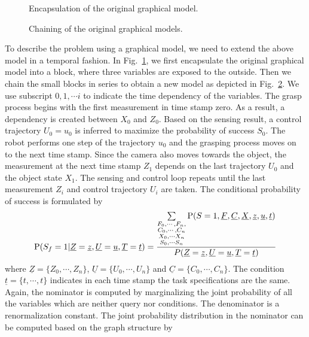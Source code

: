 \begin{figure}[!htbp]
\centering
%
\resizebox{0.5\textwidth}{!}{}
\captionsetup{justification=raggedright}
\caption{Encapsulation of the original graphical model.}
\label{fig:boxmodel}
\end{figure}	
\begin{figure}[!htbp]
\centering
%
\resizebox{1\textwidth}{!}{}
\captionsetup{justification=raggedright}
\caption{Chaining of the original graphical models.}
\label{fig:dbnet}
\end{figure}	
To describe the problem using a graphical model, we need to extend the above model in a temporal fashion. In Fig.~\ref{fig:boxmodel}, we first encapsulate the original graphical model into a block, where three variables are exposed to the outside. Then we chain the small blocks in series to obtain a new model as depicted in Fig.~\ref{fig:dbnet}. We use subscript $0,1,\cdots i$ to indicate the time dependency of the variables. The grasp process begins with the first measurement in time stamp zero. As a result, a dependency is created between $X_0$ and $Z_0$. Based on the sensing result, a control trajectory $U_0 = u_0$ is inferred to maximize the probability of success $S_0$. The robot performs one step of the trajectory $u_0$ and the grasping process moves on to the next time stamp. Since the camera also moves towards the object, the measurement at the next time stamp $Z_1$ depends on the last trajectory $U_0$ and the object state $X_1$. The sensing and control loop repeats until the last measurement $Z_i$ and control trajectory $U_i$ are taken. The conditional probability of success is formulated by 
\begin{equation}
 \operatorname*{\text{P}}(S_f=1| \underline{Z} = \underline{z},  \underline{U} = \underline{u}, \underline{T} = \underline{t}) = \frac{\sum\limits_{\substack{F_0,\cdots,F_n,\\ C_0,\cdots,C_n \\ X_0,\cdots X_n \\ S_0,\cdots S_n} }\operatorname*{\text{P}}( S = 1, \underline{F}, \underline{C}, \underline{X}, \underline{z},\underline{u}, \underline{t})} {P(\underline{Z} = \underline{z},  \underline{U} = \underline{u}, \underline{T} = \underline{t})} 
\label{equ:condition_prob_limit_sensing} 
\end{equation}
where $\underline{Z} = \{Z_0, \cdots, Z_n\}$, $ \underline{U} = \{U_0, \cdots, U_n\}$ and $\underline{C} = \{C_0, \cdots, C_n\}$. The condition $\underline{t} = \{t, \cdots, t\}$ indicates in each time stamp the task specifications are the same. Again, the nominator is computed by marginalizing the joint probability of all the variables  which are neither query nor conditions. The denominator is a renormalization constant. The joint probability distribution in the nominator can be computed based on the graph structure by 
